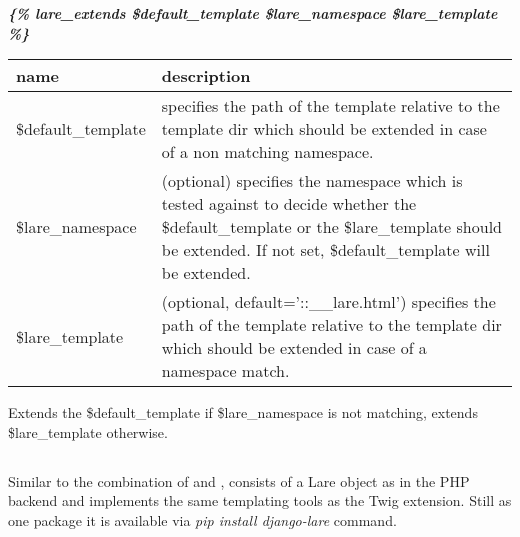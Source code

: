 \large{\textbf{\textit{\{\% lare\_extends \$default\_template \$lare\_namespace \$lare\_template \%\}}}}
\\
\begin{tabular}{|p{4cm}|p{9cm}|}
    \hline
    \textbf{name} & \textbf{description} \\
    \hline
    \$default\_template & specifies the path of the template relative to the template dir which should be extended in case of a non matching namespace. \\
    \hline
    \$lare\_namespace & (optional) specifies the namespace which is tested against to decide whether the \$default\_template or the \$lare\_template should be extended. If not set, \$default\_template will be extended. \\
    \hline
    \$lare\_template & (optional, default='::\_\_lare.html') specifies the path of the template relative to the template dir which should be extended in case of a namespace match. \\
    \hline
\end{tabular}

\noindent{}Extends the \$default\_template if \$lare\_namespace is not matching, extends \$lare\_template otherwise.


\subsection{\djangoLare{}}
Similar to the combination of \phpLare{} and \twigLare{}, \djangoLare{} consists of a Lare object as in the PHP backend and implements the same templating tools as the Twig extension.
Still as one package it is available via \emph{pip install django-lare} command.

